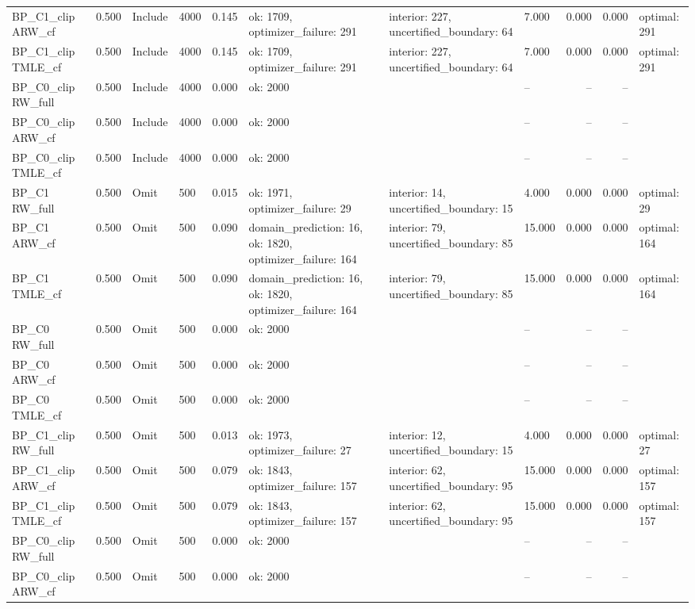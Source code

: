 \begin{tabular}{llllrlllrrl}
BP\_C1\_clip ARW\_cf & 0.500 & Include & 4000 & 0.145 & ok: 1709, optimizer\_failure: 291 & interior: 227, uncertified\_boundary: 64 & 7.000 & 0.000 & 0.000 & optimal: 291 \\
BP\_C1\_clip TMLE\_cf & 0.500 & Include & 4000 & 0.145 & ok: 1709, optimizer\_failure: 291 & interior: 227, uncertified\_boundary: 64 & 7.000 & 0.000 & 0.000 & optimal: 291 \\
BP\_C0\_clip RW\_full & 0.500 & Include & 4000 & 0.000 & ok: 2000 &  & -- & -- & -- &  \\
BP\_C0\_clip ARW\_cf & 0.500 & Include & 4000 & 0.000 & ok: 2000 &  & -- & -- & -- &  \\
BP\_C0\_clip TMLE\_cf & 0.500 & Include & 4000 & 0.000 & ok: 2000 &  & -- & -- & -- &  \\
BP\_C1 RW\_full & 0.500 & Omit & 500 & 0.015 & ok: 1971, optimizer\_failure: 29 & interior: 14, uncertified\_boundary: 15 & 4.000 & 0.000 & 0.000 & optimal: 29 \\
BP\_C1 ARW\_cf & 0.500 & Omit & 500 & 0.090 & domain\_prediction: 16, ok: 1820, optimizer\_failure: 164 & interior: 79, uncertified\_boundary: 85 & 15.000 & 0.000 & 0.000 & optimal: 164 \\
BP\_C1 TMLE\_cf & 0.500 & Omit & 500 & 0.090 & domain\_prediction: 16, ok: 1820, optimizer\_failure: 164 & interior: 79, uncertified\_boundary: 85 & 15.000 & 0.000 & 0.000 & optimal: 164 \\
BP\_C0 RW\_full & 0.500 & Omit & 500 & 0.000 & ok: 2000 &  & -- & -- & -- &  \\
BP\_C0 ARW\_cf & 0.500 & Omit & 500 & 0.000 & ok: 2000 &  & -- & -- & -- &  \\
BP\_C0 TMLE\_cf & 0.500 & Omit & 500 & 0.000 & ok: 2000 &  & -- & -- & -- &  \\
BP\_C1\_clip RW\_full & 0.500 & Omit & 500 & 0.013 & ok: 1973, optimizer\_failure: 27 & interior: 12, uncertified\_boundary: 15 & 4.000 & 0.000 & 0.000 & optimal: 27 \\
BP\_C1\_clip ARW\_cf & 0.500 & Omit & 500 & 0.079 & ok: 1843, optimizer\_failure: 157 & interior: 62, uncertified\_boundary: 95 & 15.000 & 0.000 & 0.000 & optimal: 157 \\
BP\_C1\_clip TMLE\_cf & 0.500 & Omit & 500 & 0.079 & ok: 1843, optimizer\_failure: 157 & interior: 62, uncertified\_boundary: 95 & 15.000 & 0.000 & 0.000 & optimal: 157 \\
BP\_C0\_clip RW\_full & 0.500 & Omit & 500 & 0.000 & ok: 2000 &  & -- & -- & -- &  \\
BP\_C0\_clip ARW\_cf & 0.500 & Omit & 500 & 0.000 & ok: 2000 &  & -- & -- & -- &  \\

\end{tabular}
